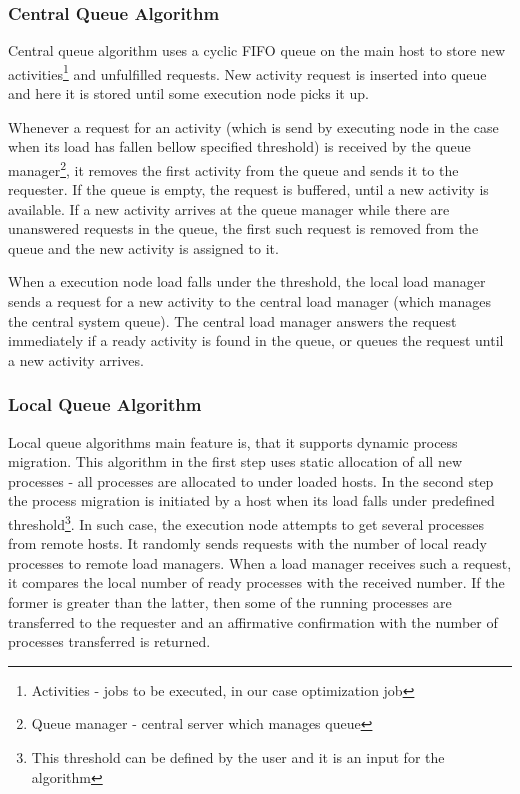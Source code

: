 \subsubsection{Central Queue Algorithm}
Central queue algorithm uses a cyclic FIFO queue on the main host to store new activities\footnote{Activities - jobs to be executed, in our case optimization job}
and unfulfilled requests.
New activity request is inserted into queue and here it is stored until some execution node picks it up.

Whenever a request for an activity (which is send by executing node in the case when its load has fallen bellow specified threshold)
is received by the queue manager\footnote{Queue manager - central server which manages queue},
it removes the first activity from the queue and sends it to the requester.
If the queue is empty, the request is buffered, until a new activity is available.
If a new activity arrives at the queue manager while there are unanswered requests in the queue,
the first such request is removed from the queue and the new activity is assigned to it.

When a execution node load falls under the threshold,
the local load manager sends a request for a new activity to the central load manager (which manages the central system queue).
The central load manager answers the request immediately if a ready activity is found in the queue,
or queues the request until a new activity arrives\cite{sharma2008performance}.


\subsubsection{Local Queue Algorithm}
Local queue algorithms main feature is, that it supports dynamic process migration.
This algorithm in the first step uses static allocation of all new processes - all processes are allocated to under loaded hosts.
In the second step the process migration is initiated by a host when its load falls under predefined threshold\footnote{
This threshold can be defined by the user and it is an input for the algorithm}.
In such case, the execution node attempts to get several processes from remote hosts.
It randomly sends requests with the number of local ready processes to remote load managers.
When a load manager receives such a request, it compares the local number of ready processes with the received number.
If the former is greater than the latter, then some of the running processes are transferred to the requester
and an affirmative confirmation with the number of processes transferred is returned.\cite{sharma2008performance}

